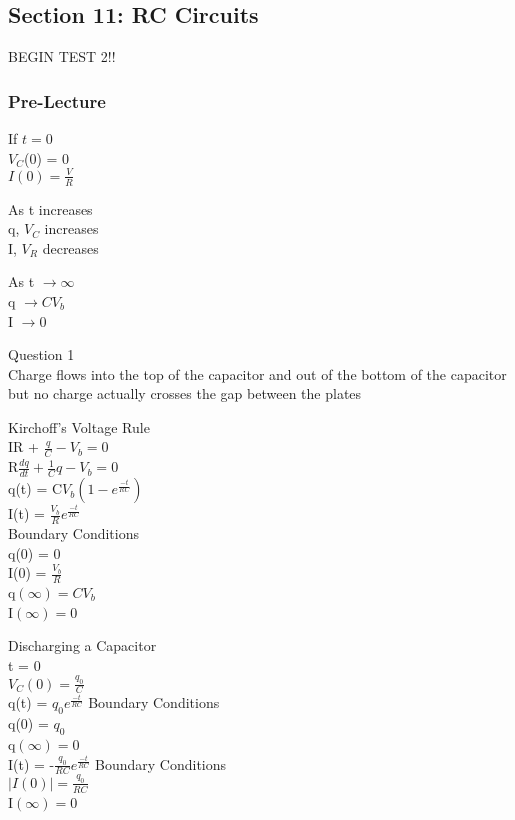 \documentclass{article}
\begin{document}
\subsection{Section 11: RC Circuits}
\noindent
BEGIN TEST 2!!
\subsubsection{Pre-Lecture}

\noindent
If $t = 0$ \\
$V_C$(0) = 0 \\
$I(0) = \frac{V}{R}$

\vspace{2mm}

\noindent
As t increases \\
q, $V_C$ increases \\
I, $V_R$ decreases

\vspace{2mm}

\noindent
As t $\to \infty$ \\
q $\to CV_b$ \\
I $\to 0$

\vspace{2mm}

\noindent
Question 1 \\
Charge flows into the top of the capacitor and out of the bottom of the capacitor \\
but no charge actually crosses the gap between the plates

\vspace{2mm}

\noindent
Kirchoff's Voltage Rule \\
IR + $\frac{q}{C} - V_b = 0$ \\
R$\frac{dq}{dt} + \frac{1}{C}q - V_b = 0$ \\
q(t) = C$V_b(1-e^{\frac{-t}{RC}})$ \\
I(t) = $\frac{V_b}{R} e^{\frac{-t}{RC}}$ \\
Boundary Conditions \\
q(0) = 0 \\
I(0) = $\frac{V_b}{R}$ \\
q$(\infty) = CV_b$ \\
I$(\infty) = 0$

\vspace{2mm}

\noindent
Discharging a Capacitor \\
t = 0 \\
$V_C(0) = \frac{q_0}{C}$ \\
q(t) = $q_0 e^{\frac{-t}{RC}}$
Boundary Conditions \\
q(0) = $q_0$ \\
q$(\infty) = 0$ \\
I(t) = -$\frac{q_0}{RC}e^{\frac{-t}{RC}}$
Boundary Conditions \\
$\vert I(0) \vert = \frac{q_0}{RC}$ \\
I$(\infty) = 0$
\end{document}
